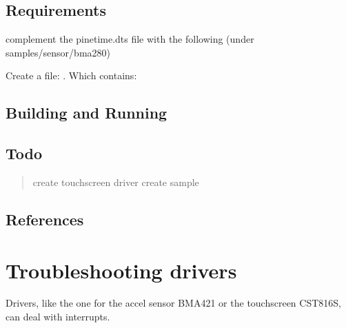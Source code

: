 \documentclass[letterpaper,10pt,english]{sphinxmanual}
\begin{document}
\subsection{Requirements}
\label{\detokenize{behind/touchscreen:requirements}}
complement the pinetime.dts file with the following (under samples/sensor/bma280)

\begin{sphinxVerbatim}[commandchars=\\\{\}]
\end{sphinxVerbatim}

Create a file: .
Which contains:

\begin{sphinxVerbatim}[commandchars=\\\{\}]
 
 
        
        
\end{sphinxVerbatim}


\subsection{Building and Running}
\label{\detokenize{behind/touchscreen:building-and-running}}

\subsection{Todo}
\label{\detokenize{behind/touchscreen:todo}}\begin{quote}

\sphinxhyphen{}create touchscreen driver
\sphinxhyphen{}create sample
\end{quote}


\subsection{References}
\label{\detokenize{behind/touchscreen:references}}

\section{Troubleshooting drivers}
\label{\detokenize{behind/troubleshoot:troubleshooting-drivers}}\label{\detokenize{behind/troubleshoot::doc}}
Drivers, like the one for the accel sensor BMA421 or the touchscreen CST816S, can deal with interrupts.
\end{document}

